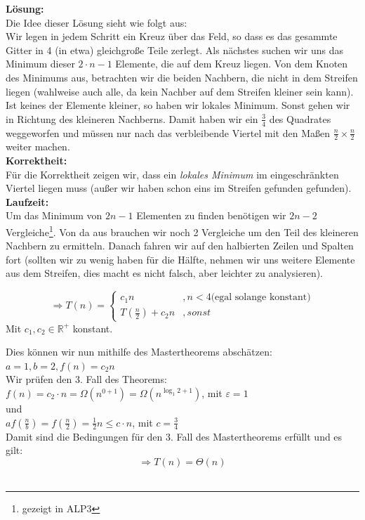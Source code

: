 \documentclass[11pt,a4paper,ngerman]{article}
\begin{document}
\begin{enumerate}[\bfseries (a)]
\textbf{Lösung:}\\

Die Idee dieser Lösung sieht wie folgt aus:\\
Wir legen in jedem Schritt ein Kreuz über das Feld, so dass es das gesammte Gitter in 4 (in etwa) gleichgroße Teile zerlegt. Als nächstes suchen wir uns das Minimum dieser $2 \cdot n - 1$ Elemente, die auf dem Kreuz liegen. Von dem Knoten des Minimums aus, betrachten wir die beiden Nachbern, die nicht in dem Streifen liegen (wahlweise auch alle, da kein Nachber auf dem Streifen kleiner sein kann). Ist keines der Elemente kleiner, so haben wir lokales Minimum. Sonst gehen wir in Richtung des kleineren Nachberns.
Damit haben wir ein $\frac{3}{4}$ des Quadrates weggeworfen und müssen nur nach das verbleibende Viertel mit den Maßen $\frac{n}{2} \times \frac{n}{2}$ weiter machen.\\

\textbf{Korrektheit:}\\
Für die Korrektheit zeigen wir, dass ein \emph{lokales Minimum} im eingeschränkten Viertel liegen muss (außer wir haben schon eins im Streifen gefunden gefunden).\\



\textbf{Laufzeit:}\\
Um das Minimum von $2n-1$ Elementen zu finden benötigen wir $2n-2$ Vergleiche\footnote{gezeigt in ALP3}. Von da aus brauchen wir noch 2 Vergleiche um den Teil des kleineren Nachbern zu ermitteln. Danach fahren wir auf den halbierten Zeilen und Spalten fort (sollten wir zu wenig haben für die Hälfte, nehmen wir uns weitere Elemente aus dem Streifen, dies macht es nicht falsch, aber leichter zu analysieren).

$$
\Rightarrow T(n) = \left\{
\begin{array}{lr}
c_1 n &, n < 4 \text{(egal solange konstant)}\\
T(\frac{n}{2}) + c_2 n &, sonst
\end{array}
\right.
$$
Mit $c_1, c_2 \in \mathbb{R}^+$ konstant.
\end{enumerate}

Dies können wir nun mithilfe des Mastertheorems abschätzen:\\
$a=1, b=2, f(n) = c_2 n$\\
Wir prüfen den 3. Fall des Theorems:\\
$f(n) = c_2 \cdot n = \Omega (n^{0 + 1})= \Omega (n^{\log_1 2 + 1})$, mit $\varepsilon = 1$\\
und\\
$a f(\frac{n}{b}) = f(\frac{n}{2}) = \frac{1}{2}n \leq c \cdot n$, mit $c = \frac{3}{4}$\\
Damit sind die Bedingungen für den 3. Fall des Mastertheorems erfüllt und es gilt:
$$
\Rightarrow T(n) = \Theta ( n)  
$$\\
\end{document}
